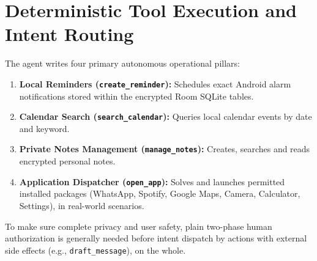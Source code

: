 \documentclass[12pt,a4paper,oneside]{report}
\begin{document}
    \begin{table}[h!]
    \centering
    \caption{On-Device Hardware Profiling Across Edge Engine Catalog}
    \label{tab:mobile_telemetry}
    \renewcommand{\arraystretch}{1.2}
    \end{table}

    \section{Deterministic Tool Execution and Intent Routing}
    The agent writes four primary autonomous operational pillars:
    \begin{enumerate}
        \item \textbf{Local Reminders (\texttt{create\_reminder}):} Schedules exact Android alarm notifications stored within the encrypted Room SQLite tables.
        \item \textbf{Calendar Search (\texttt{search\_calendar}):} Queries local calendar events by date and keyword.
        \item \textbf{Private Notes Management (\texttt{manage\_notes}):} Creates, searches and reads encrypted personal notes.
        \item \textbf{Application Dispatcher (\texttt{open\_app}):} Solves and launches permitted installed packages (WhatsApp, Spotify, Google Maps, Camera, Calculator, Settings), in real-world scenarios.
    \end{enumerate}

    To make sure complete privacy and user safety, plain two-phase human authorization is generally needed before intent dispatch by actions with external side effects (e.g., \texttt{draft\_message}), on the whole.
\end{document}
